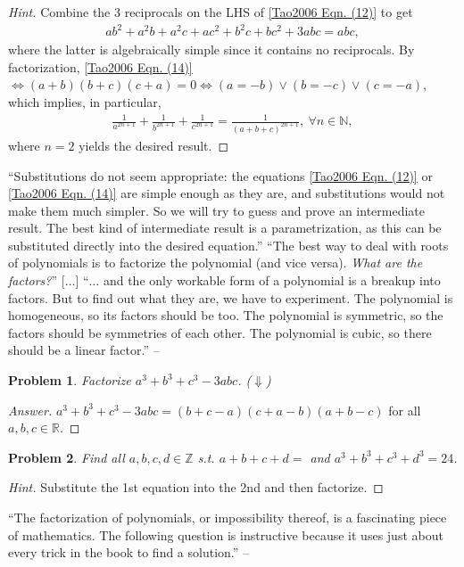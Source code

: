 \documentclass{article}
\numberwithin{equation}{section}
\newtheorem{problem}{Problem}[section]
\begin{document}
\begin{proof}[Hint] Combine the 3 reciprocals on the LHS of \eqref{Tao2006 Eqn. (12)} to get
	\begin{align}
		\label{Tao2006 Eqn. (14)}
		ab^2 + a^2b + a^2c + ac^2 + b^2c + bc^2 + 3abc = abc,
	\end{align}
	where the latter is algebraically simple since it contains no reciprocals. By factorization, \eqref{Tao2006 Eqn. (14)} $\Leftrightarrow(a + b)(b + c)(c + a) = 0\Leftrightarrow(a = -b)\lor(b = -c)\lor(c = -a)$, which implies, in particular,
	\begin{align}
		\frac{1}{a^{2n+1}} + \frac{1}{b^{2n+1}} + \frac{1}{c^{2n+1}} = \frac{1}{(a + b + c)^{2n + 1}},\ \forall n\in\mathbb{N},
	\end{align}
	where $n = 2$ yields the desired result.
\end{proof}
``Substitutions do not seem appropriate: the equations \eqref{Tao2006 Eqn. (12)} or \eqref{Tao2006 Eqn. (14)} are simple enough as they are, and substitutions would not make them much simpler. So we will try to guess and prove an intermediate result. The best kind of intermediate result is a parametrization, as this can be substituted directly into the desired equation.'' ``The best way to deal with roots of polynomials is to factorize the polynomial (and vice versa). \textit{What are the factors?}'' [$\ldots$] ``$\ldots$ and the only workable form of a polynomial is a breakup into factors. But to find out what they are, we have to experiment. The polynomial is homogeneous, so its factors should be too. The polynomial is symmetric, so the factors should be symmetries of each other. The polynomial is cubic, so there should be a linear factor.'' -- \cite[p. 44]{Tao2006}

\begin{problem}
	Factorize $a^3 + b^3 + c^3 - 3abc$. \emph{($\Downarrow$)}
\end{problem}

\begin{proof}[Answer]
	$a^3 + b^3 + c^3 - 3abc = (b + c - a)(c + a - b)(a + b - c)$ for all $a,b,c\in\mathbb{R}$.
\end{proof}

\begin{problem}
	Find all $a,b,c,d\in\mathbb{Z}$ s.t. $a + b + c + d = $ and $a^3 + b^3 + c^3 + d^3 = 24$.
\end{problem}

\begin{proof}[Hint]
	Substitute the 1st equation into the 2nd and then factorize.
\end{proof}
``The factorization of polynomials, or impossibility thereof, is a fascinating piece of mathematics. The following question is instructive because it uses just about every trick in the book to find a solution.'' -- \cite[p. 45]{Tao2006}
\end{document}
